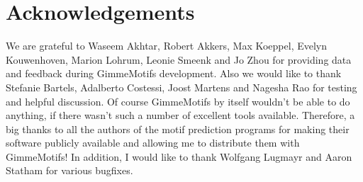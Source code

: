 \documentclass[11pt]{article}
\begin{document}

\section{Acknowledgements}
We are grateful to Waseem Akhtar, Robert Akkers, Max Koeppel, Evelyn Kouwenhoven, Marion Lohrum, Leonie Smeenk and Jo Zhou for providing data and feedback during GimmeMotifs development. Also we would like to thank Stefanie Bartels, Adalberto Costessi, Joost Martens and Nagesha Rao for testing and helpful discussion.
Of course GimmeMotifs by itself wouldn't be able to do anything, if there wasn't such a number of excellent tools available. Therefore, a big thanks to all the authors of the motif prediction programs for making their software publicly available and allowing me to distribute them with GimmeMotifs!
In addition, I would like to thank Wolfgang Lugmayr and Aaron Statham for various bugfixes.


\end{document}
